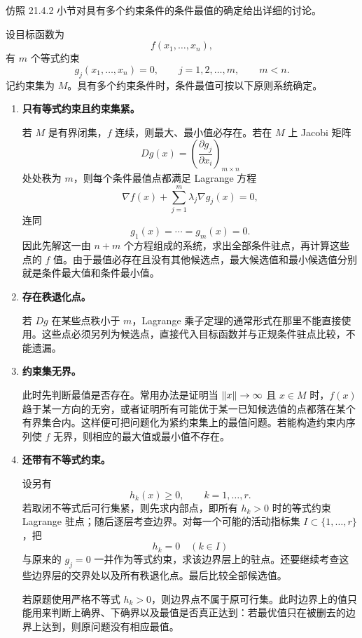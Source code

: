 \begin{xreferenceproblem}[12]
仿照 21.4.2 小节对具有多个约束条件的条件最值的确定给出详细的讨论。
\end{xreferenceproblem}
\begin{xsolution}
设目标函数为
\[
  f(x_1,\ldots,x_n),
\]
有 $m$ 个等式约束
\[
  g_j(x_1,\ldots,x_n)=0,
  \qquad j=1,2,\ldots,m,
  \qquad m<n.
\]
记约束集为 $M$。具有多个约束条件时，条件最值可按以下原则系统确定。

\begin{enumerate}[label=\arabic*.]
  \item \textbf{只有等式约束且约束集紧。}

  若 $M$ 是有界闭集，$f$ 连续，则最大、最小值必存在。若在 $M$ 上 Jacobi 矩阵
  \[
    Dg(x)=\left(\frac{\partial g_j}{\partial x_i}\right)_{m\times n}
  \]
  处处秩为 $m$，则每个条件最值点都满足 Lagrange 方程
  \[
    \nabla f(x)+\sum_{j=1}^m\lambda_j\nabla g_j(x)=0,
  \]
  连同
  \[
    g_1(x)=\cdots=g_m(x)=0.
  \]
  因此先解这一由 $n+m$ 个方程组成的系统，求出全部条件驻点，再计算这些点的 $f$ 值。由于最值必存在且没有其他候选点，最大候选值和最小候选值分别就是条件最大值和条件最小值。

  \item \textbf{存在秩退化点。}

  若 $Dg$ 在某些点秩小于 $m$，Lagrange 乘子定理的通常形式在那里不能直接使用。这些点必须另列为候选点，直接代入目标函数并与正规条件驻点比较，不能遗漏。

  \item \textbf{约束集无界。}

  此时先判断最值是否存在。常用办法是证明当 $\lVert x\rVert\to\infty$ 且 $x\in M$ 时，$f(x)$ 趋于某一方向的无穷，或者证明所有可能优于某一已知候选值的点都落在某个有界集合内。这样便可把问题化为紧约束集上的最值问题。若能构造约束内序列使 $f$ 无界，则相应的最大值或最小值不存在。

  \item \textbf{还带有不等式约束。}

  设另有
  \[
    h_k(x)\ge0,
    \qquad k=1,\ldots,r.
  \]
  若取闭不等式后可行集紧，则先求内部点，即所有 $h_k>0$ 时的等式约束 Lagrange 驻点；随后逐层考查边界。对每一个可能的活动指标集 $I\subset\{1,\ldots,r\}$，把
  \[
    h_k=0\quad(k\in I)
  \]
  与原来的 $g_j=0$ 一并作为等式约束，求该边界层上的驻点。还要继续考查这些边界层的交界处以及所有秩退化点。最后比较全部候选值。

  若原题使用严格不等式 $h_k>0$，则边界点不属于原可行集。此时边界上的值只能用来判断上确界、下确界以及最值是否真正达到：若最优值只在被删去的边界上达到，则原问题没有相应最值。


\end{enumerate}
\end{xsolution}
